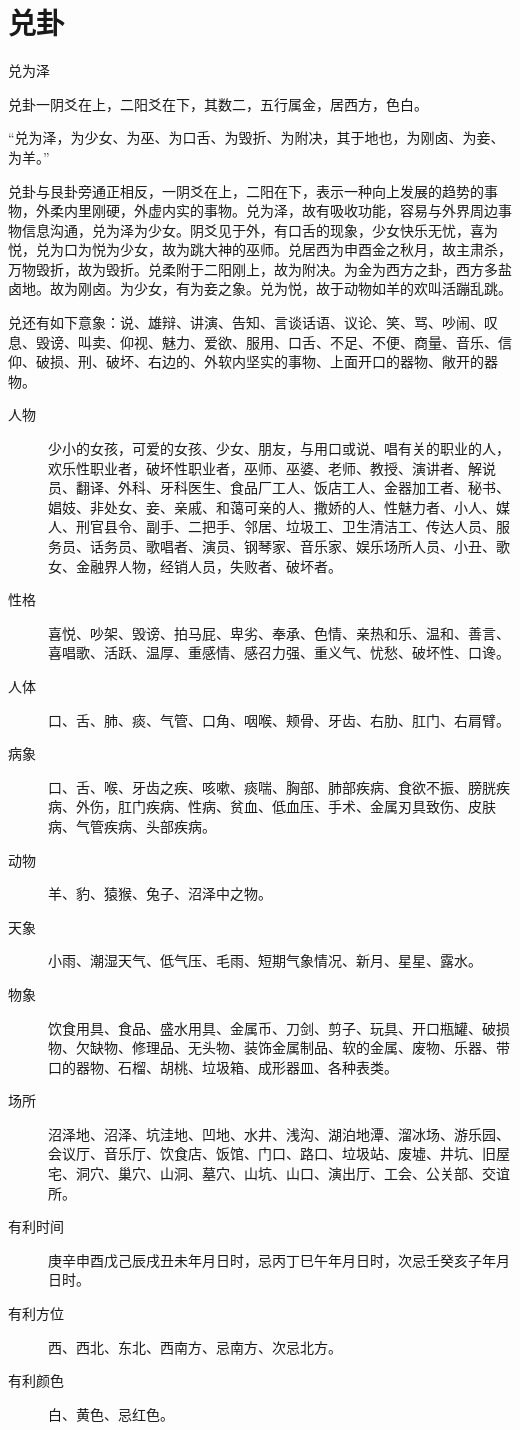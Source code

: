 \documentclass[12pt,oneside]{book}
\begin{document}
\section{兑卦}
兑为泽

兑卦一阴爻在上，二阳爻在下，其数二，五行属金，居西方，色白。

“兑为泽，为少女、为巫、为口舌、为毁折、为附决，其于地也，为刚卤、为妾、为羊。”

兑卦与艮卦旁通正相反，一阴爻在上，二阳在下，表示一种向上发展的趋势的事物，外柔内里刚硬，外虚内实的事物。兑为泽，故有吸收功能，容易与外界周边事物信息沟通，兑为泽为少女。阴爻见于外，有口舌的现象，少女快乐无忧，喜为悦，兑为口为悦为少女，故为跳大神的巫师。兑居西为申酉金之秋月，故主肃杀，万物毁折，故为毁折。兑柔附于二阳刚上，故为附决。为金为西方之卦，西方多盐卤地。故为刚卤。为少女，有为妾之象。兑为悦，故于动物如羊的欢叫活蹦乱跳。

兑还有如下意象：说、雄辩、讲演、告知、言谈话语、议论、笑、骂、吵闹、叹息、毁谤、叫卖、仰视、魅力、爱欲、服用、口舌、不足、不便、商量、音乐、信仰、破损、刑、破坏、右边的、外软内坚实的事物、上面开口的器物、敞开的器物。

\begin{description}
\item[人物] 少小的女孩，可爱的女孩、少女、朋友，与用口或说、唱有关的职业的人，欢乐性职业者，破坏性职业者，巫师、巫婆、老师、教授、演讲者、解说员、翻译、外科、牙科医生、食品厂工人、饭店工人、金器加工者、秘书、娼妓、非处女、妾、亲戚、和蔼可亲的人、撒娇的人、性魅力者、小人、媒人、刑官县令、副手、二把手、邻居、垃圾工、卫生清洁工、传达人员、服务员、话务员、歌唱者、演员、钢琴家、音乐家、娱乐场所人员、小丑、歌女、金融界人物，经销人员，失败者、破坏者。

\item[性格] 喜悦、吵架、毁谤、拍马屁、卑劣、奉承、色情、亲热和乐、温和、善言、喜唱歌、活跃、温厚、重感情、感召力强、重义气、忧愁、破坏性、口谗。
\item[人体] 口、舌、肺、痰、气管、口角、咽喉、颊骨、牙齿、右肋、肛门、右肩臂。
\item[病象] 口、舌、喉、牙齿之疾、咳嗽、痰喘、胸部、肺部疾病、食欲不振、膀胱疾病、外伤，肛门疾病、性病、贫血、低血压、手术、金属刃具致伤、皮肤病、气管疾病、头部疾病。
\item[动物] 羊、豹、猿猴、兔子、沼泽中之物。
\item[天象] 小雨、潮湿天气、低气压、毛雨、短期气象情况、新月、星星、露水。
\item[物象] 饮食用具、食品、盛水用具、金属币、刀剑、剪子、玩具、开口瓶罐、破损物、欠缺物、修理品、无头物、装饰金属制品、软的金属、废物、乐器、带口的器物、石榴、胡桃、垃圾箱、成形器皿、各种表类。
\item[场所] 沼泽地、沼泽、坑洼地、凹地、水井、浅沟、湖泊地潭、溜冰场、游乐园、会议厅、音乐厅、饮食店、饭馆、门口、路口、垃圾站、废墟、井坑、旧屋宅、洞穴、巢穴、山洞、墓穴、山坑、山口、演出厅、工会、公关部、交谊所。
\item[有利时间] 庚辛申酉戊己辰戌丑未年月日时，忌丙丁巳午年月日时，次忌壬癸亥子年月日时。
\item[有利方位] 西、西北、东北、西南方、忌南方、次忌北方。
\item[有利颜色] 白、黄色、忌红色。
\end{description}
\end{document}
